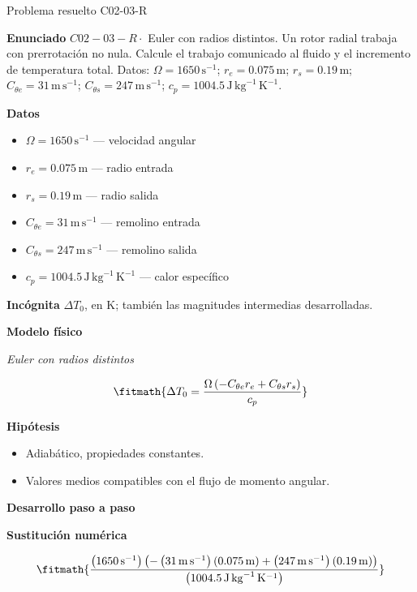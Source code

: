 \documentclass[10pt,openany]{book}
\begin{document}
\begin{studiumworked}{Problema resuelto C02-03-R}


\noindent\textbf{Enunciado}
\(C02-03-R \cdot\) Euler con radios distintos. Un rotor radial trabaja con prerrotación no nula. Calcule el trabajo comunicado al fluido y el incremento de temperatura total. Datos: \(\Omega=1650\, \mathrm{s}^{-1}\); \(r_e=0.075\, \mathrm{m}\); \(r_s=0.19\, \mathrm{m}\); \(C_{\theta e}=31\, \mathrm{m}\,\mathrm{s}^{-1}\); \(C_{\theta s}=247\, \mathrm{m}\,\mathrm{s}^{-1}\); \(c_p=1004.5\, \mathrm{J}\,\mathrm{kg}^{-1}\,\mathrm{K}^{-1}\).

\noindent\textbf{Datos}
\begin{itemize}
\item $\Omega = 1650\,\mathrm{s}^{-1}$ — velocidad angular
\item $r_e = 0.075\,\mathrm{m}$ — radio entrada
\item $r_s = 0.19\,\mathrm{m}$ — radio salida
\item $C_{\theta e} = 31\,\mathrm{m}\,\mathrm{s}^{-1}$ — remolino entrada
\item $C_{\theta s} = 247\,\mathrm{m}\,\mathrm{s}^{-1}$ — remolino salida
\item $c_p = 1004.5\,\mathrm{J}\,\mathrm{kg}^{-1}\,\mathrm{K}^{-1}$ — calor específico
\end{itemize}

\noindent\textbf{Incógnita}
$\Delta T_0$, en $\mathrm{K}$; también las magnitudes intermedias desarrolladas.

\noindent\textbf{Modelo físico}

\noindent\textit{Euler con radios distintos}

\[
\fitmath{\Delta T_0=\frac{\Omega \left(- C_{\theta e} r_e + C_{\theta s} r_s\right)}{c_p}}
\]

\noindent\textbf{Hipótesis}
\begin{itemize}
\item Adiabático, propiedades constantes.
\item Valores medios compatibles con el flujo de momento angular.
\end{itemize}

\noindent\textbf{Desarrollo paso a paso}



\noindent\textbf{Sustitución numérica}

\[
\fitmath{\frac{\left(1650\,\mathrm{s}^{-1}\right) \left(- \left(31\,\mathrm{m}\,\mathrm{s}^{-1}\right) \left(0.075\,\mathrm{m}\right) + \left(247\,\mathrm{m}\,\mathrm{s}^{-1}\right) \left(0.19\,\mathrm{m}\right)\right)}{\left(1004.5\,\mathrm{J}\,\mathrm{kg}^{-1}\,\mathrm{K}^{-1}\right)}}
\]


\end{studiumworked}
\end{document}
